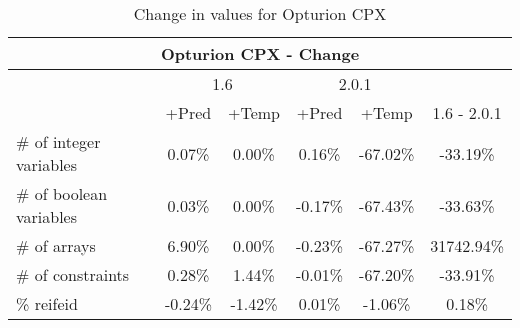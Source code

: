 \documentclass{standalone}
\begin{document}
\begin{table}[H]
\footnotesize
\centering
\begin{tabular}{lc|c|c|c|c}
\multicolumn{6}{c}{Opturion CPX - Change} \\ 
\hline\hline  & \multicolumn{2}{c|}{1.6} &\multicolumn{2}{c|}{2.0.1} &\\ 
\hline  & +Pred & +Temp & +Pred & +Temp & 1.6 - 2.0.1\\
\# of integer variables & 0.07\% & 0.00\% & 0.16\% & -67.02\% & -33.19\% \\ 
\# of boolean variables & 0.03\% & 0.00\% & -0.17\% & -67.43\% & -33.63\% \\ 
\# of arrays            & 6.90\% & 0.00\% & -0.23\% & -67.27\% & 31742.94\% \\
\# of constraints       & 0.28\% & 1.44\% & -0.01\% & -67.20\% & -33.91\% \\ 
\% reifeid               & -0.24\% & -1.42\% & 0.01\% & -1.06\% & 0.18\%\\ 
\end{tabular}\caption{Change in values for Opturion CPX}
\end{table}
\end{document}
